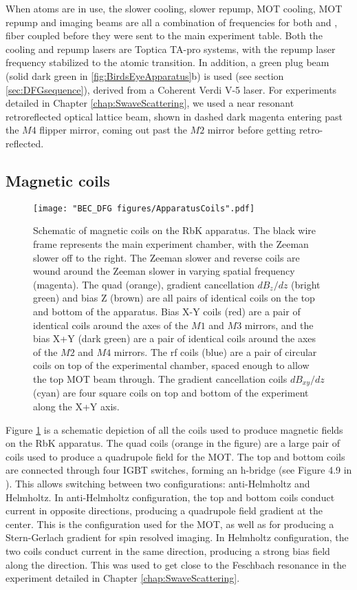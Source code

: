 When \K{} atoms are in use, the slower cooling, slower repump, MOT cooling, MOT repump and imaging beams are all a combination of frequencies for both \Rb{} and \K{}, fiber coupled before they were sent to the main experiment table. Both the \K{} cooling and repump lasers are Toptica TA-pro systems, with the repump laser frequency stabilized to the \K{} atomic transition. In addition, a green plug beam (solid dark green in \ref{fig:BirdsEyeApparatus}b) is used (see section \ref{sec:DFGsequence}), derived from a Coherent Verdi V-5 laser. For \K{} experiments detailed in Chapter \ref{chap:SwaveScattering}, we used a near resonant retroreflected optical lattice beam, shown in dashed dark magenta entering past the $M4$ flipper mirror, coming out past the $M2$ mirror before getting retro-reflected.

\subsection{Magnetic coils}\label{sec:magneticCoils}
\begin{figure}
	\texttt{[image: "BEC\_DFG figures/ApparatusCoils".pdf]}
\caption[Schematic of magnetic coils on the RbK apparatus]{Schematic of magnetic coils on the RbK apparatus. The black wire frame represents the main experiment chamber, with the Zeeman slower off to the right. The Zeeman slower and reverse coils are wound around the Zeeman slower in varying spatial frequency (magenta). The quad (orange), gradient cancellation $dB_z/dz$ (bright green) and bias Z (brown) are all pairs of identical coils on the top and bottom of the apparatus. Bias X-Y coils (red) are a pair of identical coils around the axes of the $M1$ and $M3$ mirrors, and the bias X+Y (dark green) are a pair of identical coils around the axes of the $M2$ and $M4$ mirrors. The rf coils (blue) are a pair of circular coils on top of the experimental chamber, spaced enough to allow the top MOT beam through. The gradient cancellation coils $dB_{xy}/dz$ (cyan) are four square coils on top and bottom of the experiment along the X+Y axis. }
\label{fig:ApparatusCoils}
\end{figure}

Figure \ref{fig:ApparatusCoils} is a schematic depiction of all the coils used to produce magnetic fields on the RbK apparatus. The quad coils (orange in the figure) are a large pair of coils used to produce a quadrupole field for the MOT. The top and bottom coils are connected through four IGBT switches, forming an h-bridge (see Figure 4.9 in \cite{AycockThesis}). This allows switching between two configurations: anti-Helmholtz and Helmholtz. In anti-Helmholtz configuration, the top and bottom coils conduct current in opposite directions, producing a quadrupole field gradient at the center. This is the configuration used for the MOT, as well as for producing a Stern-Gerlach gradient for spin resolved imaging. In Helmholtz configuration, the two coils conduct current in the same direction, producing a strong bias field along the \ez{} direction. This was used to get close to the Feschbach resonance in the experiment detailed in Chapter \ref{chap:SwaveScattering}. 

